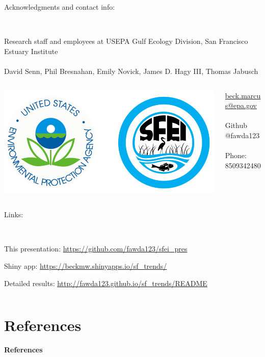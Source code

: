\documentclass[serif]{beamer}\usepackage[]{graphicx}\usepackage[]{color}
\begin{document}
\begin{frame}
Acknowledgments and contact info:\\~\\
\begin{columns}
\begin{column}{0.9\textwidth}
{\footnotesize
Research staff and employees at USEPA Gulf Ecology Division, San Francisco Estuary Institute \\~\\
David Senn, Phil Bresnahan, Emily Novick, James D. Hagy III, Thomas Jabusch
}
\end{column}
\end{columns}
\vfill
\begin{columns}
\begin{column}{0.5\textwidth}
\begin{center}
\includegraphics[width=0.7\linewidth]{fig/titlegraphic.png}
\end{center}
\end{column}
\begin{column}{0.5\textwidth}
\scriptsize
\begin{center}
\href{mailto:beck.marcus@epa.gov}{beck.marcus@epa.gov} \\~\\
Github @fawda123 \\~\\
Phone: 8509342480
\end{center}
\end{column}
\end{columns}
\vfill
Links:\\~\\
\begin{columns}
\begin{column}{0.9\textwidth}
\scriptsize
This presentation: \href{https://github.com/fawda123/sfei_pres}{\url{https://github.com/fawda123/sfei\_pres}}

Shiny app: \href{https://beckmw.shinyapps.io/sf_trends/}{\url{https://beckmw.shinyapps.io/sf_trends/}}

Detailed results: \href{http://fawda123.github.io/sf_trends/README}{\url{http://fawda123.github.io/sf\_trends/README}}
\end{column}
\end{columns}
\end{frame}

\section{References}
\begin{frame}[t]{\textbf{References}}
\tiny
{}


\end{frame}
\end{document}

